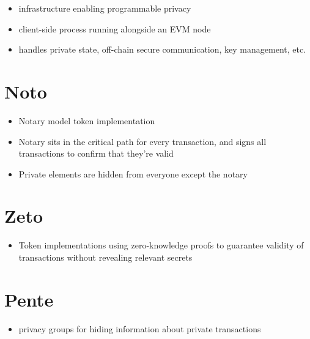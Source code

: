 \documentclass[conference,compsoc,onecolumn]{IEEEtran}
\begin{document}
\begin{itemize}
  \item infrastructure enabling programmable privacy
  \item client-side process running alongside an EVM node
  \item handles private state, off-chain secure communication, key management, etc.
\end{itemize}

\section{Noto}

\begin{itemize}
  \item Notary model token implementation
  \item Notary sits in the critical path for every transaction, and signs all transactions to confirm that they're valid
  \item Private elements are hidden from everyone except the notary
\end{itemize}

\section{Zeto}

\begin{itemize}
  \item Token implementations using zero-knowledge proofs to guarantee validity of transactions without revealing relevant secrets
\end{itemize}

\section{Pente}

\begin{itemize}
  \item privacy groups for hiding information about private transactions
\end{itemize}


% 
% 
% 






\appendices
% 
\end{document}
